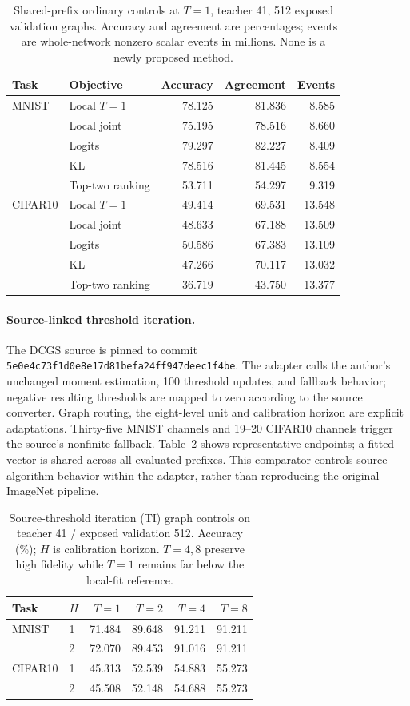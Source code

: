 \documentclass[10pt,twocolumn,letterpaper]{article}
\begin{document}
\begin{table}[t]\centering\small
\caption{Shared-prefix ordinary controls at $T=1$, teacher 41, 512 exposed validation graphs. Accuracy and agreement are percentages; events are whole-network nonzero scalar events in millions. None is a newly proposed method.}
\label{tab:objectives}
\setlength{\tabcolsep}{3pt}\begin{tabular}{llrrr}\toprule
Task & Objective & Accuracy & Agreement & Events\\\midrule
MNIST & Local $T=1$ &78.125&81.836&8.585\\
 & Local joint &75.195&78.516&8.660\\
 & Logits &79.297&82.227&8.409\\
 & KL &78.516&81.445&8.554\\
 & Top-two ranking &53.711&54.297&9.319\\\midrule
CIFAR10 & Local $T=1$ &49.414&69.531&13.548\\
 & Local joint &48.633&67.188&13.509\\
 & Logits &50.586&67.383&13.109\\
 & KL &47.266&70.117&13.032\\
 & Top-two ranking &36.719&43.750&13.377\\\bottomrule
\end{tabular}\end{table}

\paragraph{Source-linked threshold iteration.} The DCGS source is pinned to commit \texttt{5e0e4c73f1d0e8e17d81befa24ff947deec1f4be}. The adapter calls the author's unchanged moment estimation, 100 threshold updates, and fallback behavior; negative resulting thresholds are mapped to zero according to the source converter. Graph routing, the eight-level unit and calibration horizon are explicit adaptations. Thirty-five MNIST channels and 19--20 CIFAR10 channels trigger the source's nonfinite fallback. Table~\ref{tab:ti} shows representative endpoints; a fitted vector is shared across all evaluated prefixes. This comparator controls source-algorithm behavior within the adapter, rather than reproducing the original ImageNet pipeline.

\begin{table}[t]\centering\small
\caption{Source-threshold iteration (TI) graph controls on teacher 41 / exposed validation 512. Accuracy (\%); $H$ is calibration horizon. $T=4,8$ preserve high fidelity while $T=1$ remains far below the local-fit reference.}
\label{tab:ti}
\begin{tabular}{llrrrr}\toprule
Task & $H$ & $T=1$ & $T=2$ & $T=4$ & $T=8$\\\midrule
MNIST & 1&71.484&89.648&91.211&91.211\\
 &2&72.070&89.453&91.016&91.211\\
CIFAR10 &1&45.313&52.539&54.883&55.273\\
 &2&45.508&52.148&54.688&55.273\\\bottomrule
\end{tabular}\end{table}
\end{document}
